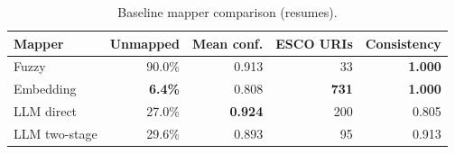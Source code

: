 \begin{table}[htbp]
  \centering
  \caption{Baseline mapper comparison (resumes).}
  \label{tab:baseline-res}
  \begin{tabular}{lrrrr}
    \toprule
    Mapper & Unmapped & Mean conf. & ESCO URIs & Consistency \\
    \midrule
  Fuzzy & 90.0\% & 0.913 & 33 & \textbf{1.000} \\
  Embedding & \textbf{6.4\%} & 0.808 & \textbf{731} & \textbf{1.000} \\
  LLM direct & 27.0\% & \textbf{0.924} & 200 & 0.805 \\
  LLM two-stage & 29.6\% & 0.893 & 95 & 0.913 \\
    \bottomrule
  \end{tabular}
\end{table}